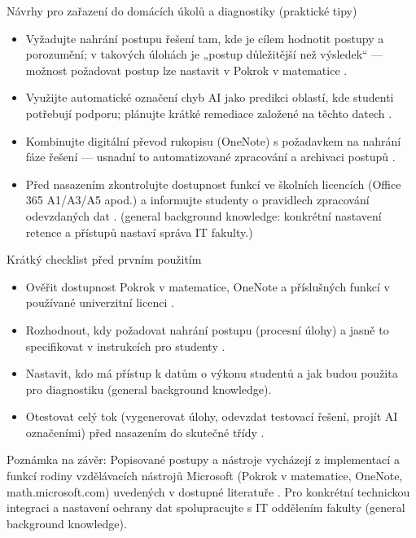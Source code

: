 Návrhy pro zařazení do domácích úkolů a diagnostiky (praktické tipy)
\begin{itemize}
  \item Vyžadujte nahrání postupu řešení tam, kde je cílem hodnotit postupy a porozumění; v takových úlohách je „postup důležitější než výsledek“ — možnost požadovat postup lze nastavit v Pokrok v matematice \cite{kb_ai_101_tipu_pdf_04e4a115_page_8_1}.
  \item Využijte automatické označení chyb AI jako predikci oblastí, kde studenti potřebují podporu; plánujte krátké remediace založené na těchto datech \cite{kb_ai_101_tipu_pdf_04e4a115_page_8_1}.
  \item Kombinujte digitální převod rukopisu (OneNote) s požadavkem na nahrání fáze řešení — usnadní to automatizované zpracování a archivaci postupů \cite{kb_ai_101_tipu_pdf_04e4a115_page_8_1}.
  \item Před nasazením zkontrolujte dostupnost funkcí ve školních licencích (Office 365 A1/A3/A5 apod.) a informujte studenty o pravidlech zpracování odevzdaných dat \cite{kb_ai_101_tipu_pdf_04e4a115_page_3_1}. (general background knowledge: konkrétní nastavení retence a přístupů nastaví správa IT fakulty.)
\end{itemize}

Krátký checklist před prvním použitím
\begin{itemize}
  \item Ověřit dostupnost Pokrok v matematice, OneNote a příslušných funkcí v používané univerzitní licenci \cite{kb_ai_101_tipu_pdf_04e4a115_page_3_1}.
  \item Rozhodnout, kdy požadovat nahrání postupu (procesní úlohy) a jasně to specifikovat v instrukcích pro studenty \cite{kb_ai_101_tipu_pdf_04e4a115_page_8_1}.
  \item Nastavit, kdo má přístup k datům o výkonu studentů a jak budou použita pro diagnostiku (general background knowledge).
  \item Otestovat celý tok (vygenerovat úlohy, odevzdat testovací řešení, projít AI označeními) před nasazením do skutečné třídy \cite{kb_ai_101_tipu_pdf_04e4a115_page_8_1}.
\end{itemize}

Poznámka na závěr: Popisované postupy a nástroje vycházejí z implementací a funkcí rodiny vzdělávacích nástrojů Microsoft (Pokrok v matematice, OneNote, math.microsoft.com) uvedených v dostupné literatuře \cite{kb_ai_101_tipu_pdf_04e4a115_page_8_1,kb_ai_101_tipu_pdf_04e4a115_page_3_1}. Pro konkrétní technickou integraci a nastavení ochrany dat spolupracujte s IT oddělením fakulty (general background knowledge).